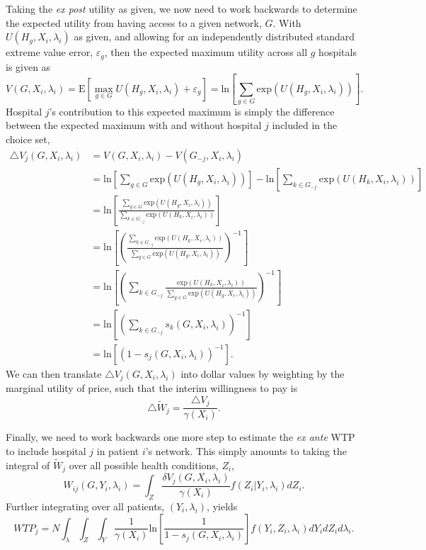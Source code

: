 \documentclass[
  letterpaper,
  DIV=11,
  numbers=noendperiod]{scrreport}
\theoremstyle{definition}
\theoremstyle{remark}
\begin{document}
Taking the \textit{ex post} utility as given, we now need to work
backwards to determine the expected utility from having access to a
given network, \(G\). With \(U(H_{g},X_{i},\lambda_{i})\) as given, and
allowing for an independently distributed standard extreme value error,
\(\varepsilon_{g}\), then the expected maximum utility across all \(g\)
hospitals is given as
\[V(G,X_{i},\lambda_{i}) = \text{E} \left[\max_{g\in G} U(H_{g},X_{i},\lambda_{i}) + \varepsilon_{g} \right] = \text{ln} \left[\sum_{g\in G} \text{exp} (U(H_{g},X_{i},\lambda_{i})) \right].\]
Hospital \(j\)'s contribution to this expected maximum is simply the
difference between the expected maximum with and without hospital \(j\)
included in the choice set, \[\begin{align*}
\triangle V_{j}(G,X_{i},\lambda_{i}) &= V(G,X_{i},\lambda_{i}) - V(G_{-j},X_{i},\lambda_{i}) \\
 &= \text{ln} \left[\sum_{g\in G} \text{exp} (U(H_{g},X_{i},\lambda_{i})) \right] - \text{ln} \left[\sum_{k\in G_{-j}} \text{exp} (U(H_{k},X_{i},\lambda_{i})) \right] \\
 &= \text{ln} \left[ \frac{\sum_{g\in G} \text{exp} (U(H_{g},X_{i},\lambda_{i})) }{\sum_{k\in G_{-j}} \text{exp} (U(H_{k},X_{i},\lambda_{i}))} \right] \\
 &= \text{ln} \left[ \left(\frac{\sum_{k\in G_{-j}} \text{exp} (U(H_{k},X_{i},\lambda_{i})) }{\sum_{g\in G} \text{exp} (U(H_{g},X_{i},\lambda_{i})) }\right)^{-1} \right] \\
 &= \text{ln} \left[ \left(\sum_{k\in G_{-j}} \frac{ \text{exp} (U(H_{k},X_{i},\lambda_{i})) }{\sum_{g\in G} \text{exp} (U(H_{g},X_{i},\lambda_{i})) }\right)^{-1} \right] \\
 &= \text{ln} \left[ \left(\sum_{k\in G_{-j}} s_{k}(G,X_{i},\lambda_{i})\right)^{-1} \right] \\
 &= \text{ln} \left[ \left( 1- s_{j}(G,X_{i},\lambda_{i})\right)^{-1} \right].
\end{align*}\] We can then translate
\(\triangle V_{j}(G,X_{i},\lambda_{i})\) into dollar values by weighting
by the marginal utility of price, such that the interim willingness to
pay is
\[\triangle \tilde{W}_{j} = \frac{\triangle V_{j}}{\gamma (X_{i})}.\]

Finally, we need to work backwards one more step to estimate the
\textit{ex ante} WTP to include hospital \(j\) in patient \(i\)'s
network. This simply amounts to taking the integral of \(\tilde{W}_{j}\)
over all possible health conditions, \(Z_{i}\),
\[W_{ij}(G,Y_{i},\lambda_{i}) = \int_{Z} \frac{\delta V_{j}(G,X_{i},\lambda_{i})}{\gamma (X_{i})} f(Z_{i}|Y_{i},\lambda_{i}) dZ_{i}.\]
Further integrating over all patients, \((Y_{i},\lambda_{i})\), yields
\[WTP_{j} = N \int_{\lambda} \int_{Z} \int_{Y} \frac{1}{\gamma (X_{i})} \text{ln}\left[\frac{1}{1-s_{j}(G,X_{i},\lambda_{i})} \right]f(Y_{i},Z_{i},\lambda_{i})dY_{i} dZ_{i} d\lambda_{i}.\]
\end{document}

